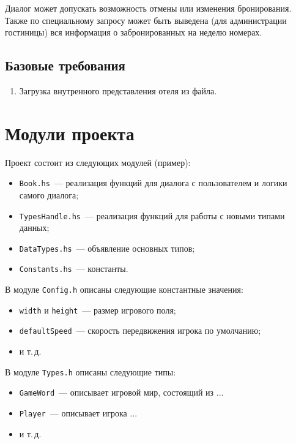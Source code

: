 \documentclass[oneside,final,14pt]{extarticle}
\begin{document}
Диалог может допускать возможность отмены или изменения бронирования. Также по
специальному запросу может быть выведена (для администрации гостиницы) вся
информация о забронированных на неделю номерах.

\subsection{Базовые требования}

\begin{enumerate}
    \item Загрузка внутренного представления отеля из файла.
\end{enumerate}

\section{Модули проекта}

Проект состоит из следующих модулей (пример):
\begin{itemize}
    \item \texttt{Book.hs}~--- реализация функций для диалога с пользователем и логики самого диалога;
    \item \texttt{TypesHandle.hs}~--- реализация функций для работы с новыми типами данных;
    \item \texttt{DataTypes.hs}~--- объявление основных типов;
    \item \texttt{Constants.hs}~--- константы.

\end{itemize}

В модуле \texttt{Config.h} описаны следующие константные значения:
\begin{itemize}
    \item \texttt{width} и \texttt{height}~--- размер игрового поля;
    \item \texttt{defaultSpeed}~--- скорость передвижения игрока по умолчанию;
    \item и т.\,д.
\end{itemize}

В модуле \texttt{Types.h} описаны следующие типы:
\begin{itemize}
    \item \texttt{GameWord}~--- описывает игровой мир, состоящий из ...
    \item \texttt{Player}~--- описывает игрока ...
    \item и т.\,д.
\end{itemize}
\end{document}
